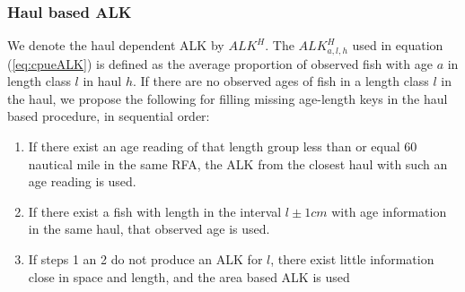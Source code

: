 \documentclass[a4paper 12pt]{article}
\numberwithin{equation}{section}
\newcommand{\ed}[1]{\textcolor{red}{#1}}
\newcommand{\olav}[1]{\textcolor{darkgreen}{#1}}
\begin{document}
\subsubsection{Haul based ALK}
\label{sec:haulestimator}
We denote the haul dependent ALK  by  $ALK^{H}$. The $ALK^{H}_{a,l,h}$  used in equation (\ref{eq:cpueALK}) is defined as the average proportion of observed fish with age $a$ in  length class $l$ in haul $h$. If there are no observed ages of fish in a length class $l$ in the haul, we propose the following for filling missing age-length keys in the  haul based procedure, in sequential order:
\begin{enumerate}
\item If there exist an age reading of that length group less than or equal 60 nautical mile in the same RFA, the ALK from the closest haul with such an age reading is used.
\item If there exist a fish with length in the interval $l\pm 1cm$ with age information in the same haul, that observed age is used.  
\item If steps 1 an 2 do not produce an ALK for $l$, there exist little information close in space and length, and the area based ALK is used %
\end{enumerate}
\end{document}
